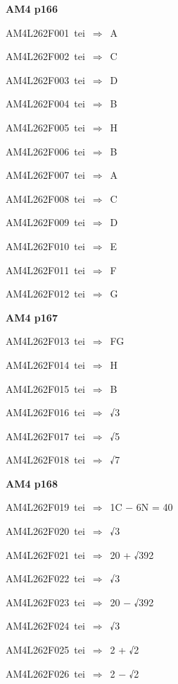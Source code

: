 \par\vfill\eject
{\bf\hfill AM4 p166\hfill\hbox{}}\par\bigskip
{\sixrm AM4L262F001\ {\sixit tei}\ }$\Rightarrow$\ A\par\smallskip
{\sixrm AM4L262F002\ {\sixit tei}\ }$\Rightarrow$\ C\par\smallskip
{\sixrm AM4L262F003\ {\sixit tei}\ }$\Rightarrow$\ D\par\smallskip
{\sixrm AM4L262F004\ {\sixit tei}\ }$\Rightarrow$\ B\par\smallskip
{\sixrm AM4L262F005\ {\sixit tei}\ }$\Rightarrow$\ H\par\smallskip
{\sixrm AM4L262F006\ {\sixit tei}\ }$\Rightarrow$\ B\par\smallskip
{\sixrm AM4L262F007\ {\sixit tei}\ }$\Rightarrow$\ A\par\smallskip
{\sixrm AM4L262F008\ {\sixit tei}\ }$\Rightarrow$\ C\par\smallskip
{\sixrm AM4L262F009\ {\sixit tei}\ }$\Rightarrow$\ D\par\smallskip
{\sixrm AM4L262F010\ {\sixit tei}\ }$\Rightarrow$\ E\par\smallskip
{\sixrm AM4L262F011\ {\sixit tei}\ }$\Rightarrow$\ F\par\smallskip
{\sixrm AM4L262F012\ {\sixit tei}\ }$\Rightarrow$\ G\par\smallskip

\par\vfill\eject
{\bf\hfill AM4 p167\hfill\hbox{}}\par\bigskip
{\sixrm AM4L262F013\ {\sixit tei}\ }$\Rightarrow$\ FG\par\smallskip
{\sixrm AM4L262F014\ {\sixit tei}\ }$\Rightarrow$\ H\par\smallskip
{\sixrm AM4L262F015\ {\sixit tei}\ }$\Rightarrow$\ B\par\smallskip
{\sixrm AM4L262F016\ {\sixit tei}\ }$\Rightarrow$\ √3\par\smallskip
{\sixrm AM4L262F017\ {\sixit tei}\ }$\Rightarrow$\ √5\par\smallskip
{\sixrm AM4L262F018\ {\sixit tei}\ }$\Rightarrow$\ √7\par\smallskip

\par\vfill\eject
{\bf\hfill AM4 p168\hfill\hbox{}}\par\bigskip
{\sixrm AM4L262F019\ {\sixit tei}\ }$\Rightarrow$\ 1C − 6N = 40\par\smallskip
{\sixrm AM4L262F020\ {\sixit tei}\ }$\Rightarrow$\ √3\par\smallskip
{\sixrm AM4L262F021\ {\sixit tei}\ }$\Rightarrow$\ 20 + √392\par\smallskip
{\sixrm AM4L262F022\ {\sixit tei}\ }$\Rightarrow$\ √3\par\smallskip
{\sixrm AM4L262F023\ {\sixit tei}\ }$\Rightarrow$\ 20 − √392\par\smallskip
{\sixrm AM4L262F024\ {\sixit tei}\ }$\Rightarrow$\ √3\par\smallskip
{\sixrm AM4L262F025\ {\sixit tei}\ }$\Rightarrow$\ 2 + √2\par\smallskip
{\sixrm AM4L262F026\ {\sixit tei}\ }$\Rightarrow$\ 2 − √2\par\smallskip

